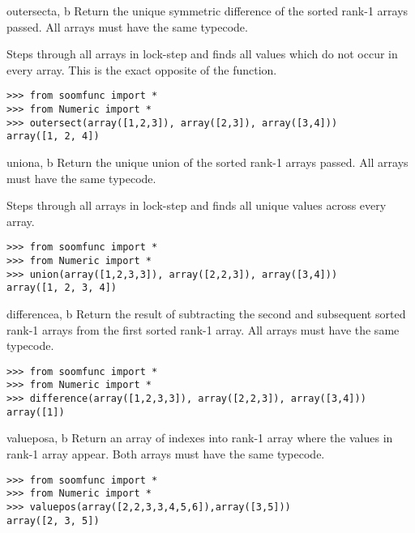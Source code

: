 \begin{funcdesc}{outersect}{a, b \optional{, \ldots}}
Return the unique symmetric difference of the sorted rank-1 arrays
passed.  All arrays must have the same typecode.

Steps through all arrays in lock-step and finds all values which do
not occur in every array.  This is the exact opposite of the
 function.

\begin{verbatim}
>>> from soomfunc import * 
>>> from Numeric import *
>>> outersect(array([1,2,3]), array([2,3]), array([3,4]))
array([1, 2, 4])
\end{verbatim}
\end{funcdesc}

\begin{funcdesc}{union}{a, b \optional{, \ldots}}
Return the unique union of the sorted rank-1 arrays passed.  All
arrays must have the same typecode.

Steps through all arrays in lock-step and finds all unique values
across every array.

\begin{verbatim}
>>> from soomfunc import * 
>>> from Numeric import *
>>> union(array([1,2,3,3]), array([2,2,3]), array([3,4]))
array([1, 2, 3, 4])
\end{verbatim}
\end{funcdesc}

\begin{funcdesc}{difference}{a, b \optional{, \ldots}}
Return the result of subtracting the second and subsequent sorted
rank-1 arrays from the first sorted rank-1 array.  All arrays must
have the same typecode.

\begin{verbatim}
>>> from soomfunc import * 
>>> from Numeric import *
>>> difference(array([1,2,3,3]), array([2,2,3]), array([3,4]))
array([1])
\end{verbatim}
\end{funcdesc}

\begin{funcdesc}{valuepos}{a, b}
Return an array of indexes into rank-1 array  where the values
in rank-1 array  appear.  Both arrays must have the same
typecode.

\begin{verbatim}
>>> from soomfunc import * 
>>> from Numeric import *
>>> valuepos(array([2,2,3,3,4,5,6]),array([3,5]))
array([2, 3, 5])
\end{verbatim}
\end{funcdesc}

